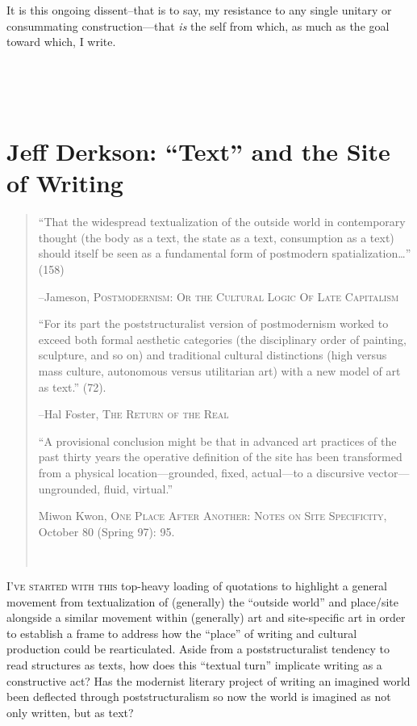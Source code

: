 \documentclass[
]{memoir}
\begin{document}
It is this ongoing dissent--that is to say, my resistance to any single
unitary or consummating construction---that \emph{is} the self from
which, as much as the goal toward which, I write.

~

~

\hypertarget{jeff-derkson-text-and-the-site-of-writing}{%
\chapter{Jeff Derkson: ``Text'' and the Site of
Writing}\label{jeff-derkson-text-and-the-site-of-writing}}

\begin{quote}
``That the widespread textualization of the outside world in
contemporary thought (the body as a text, the state as a text,
consumption as a text) should itself be seen as a fundamental form of
postmodern spatialization\ldots{}'' (158)

--Jameson, \textsc{Postmodernism: Or the Cultural Logic Of Late
Capitalism}

``For its part the poststructuralist version of postmodernism worked to
exceed both formal aesthetic categories (the disciplinary order of
painting, sculpture, and so on) and traditional cultural distinctions
(high versus mass culture, autonomous versus utilitarian art) with a new
model of art as text.'' (72).

--Hal Foster, \textsc{The Return of the Real}

``A provisional conclusion might be that in advanced art practices of
the past thirty years the operative definition of the site has been
transformed from a physical location---grounded, fixed, actual---to a
discursive vector---ungrounded, fluid, virtual.''

Miwon Kwon, \textsc{One Place After Another: Notes on Site Specificity},
October 80 (Spring 97): 95.

~
\end{quote}

\lettrine[lines=3, findent=0em, nindent=0.1em, lhang=0]{I}{’ve started with this}
top-heavy loading of quotations to highlight a general movement from
textualization of (generally) the ``outside world'' and place/site
alongside a similar movement within (generally) art and site-specific
art in order to establish a frame to address how the ``place'' of
writing and cultural production could be rearticulated. Aside from a
poststructuralist tendency to read structures as texts, how does this
``textual turn'' implicate writing as a constructive act? Has the
modernist literary project of writing an imagined world been deflected
through poststructuralism so now the world is imagined as not only
written, but as text?
\end{document}
